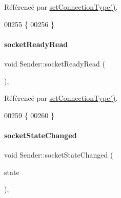 Référencé par \hyperlink{class_simple_mail_1_1_sender_a879bee44b1e7afed564c82b81261a9b1}{set\+Connection\+Type()}.


\begin{DoxyCode}
00255 \{
00256 \}
\end{DoxyCode}
\mbox{\label{class_simple_mail_1_1_sender_a10913c23ccdb416865aa82a9139c6a08}} 
\paragraph{\texorpdfstring{socket\+Ready\+Read}{socketReadyRead}}
{\footnotesize\ttfamily void Sender\+::socket\+Ready\+Read (\begin{DoxyParamCaption}{ }\end{DoxyParamCaption})\hspace{0.3cm}{\ttfamily [protected]}, {\ttfamily [slot]}}



Référencé par \hyperlink{class_simple_mail_1_1_sender_a879bee44b1e7afed564c82b81261a9b1}{set\+Connection\+Type()}.


\begin{DoxyCode}
00259 \{
00260 \}
\end{DoxyCode}
\mbox{\label{class_simple_mail_1_1_sender_a40254c3f25402c5f9f813924a4770cd6}} 
\paragraph{\texorpdfstring{socket\+State\+Changed}{socketStateChanged}}
{\footnotesize\ttfamily void Sender\+::socket\+State\+Changed (\begin{DoxyParamCaption}\item[{Q\+Abstract\+Socket\+::\+Socket\+State}]{state }\end{DoxyParamCaption})\hspace{0.3cm}{\ttfamily [protected]}, {\ttfamily [slot]}}



